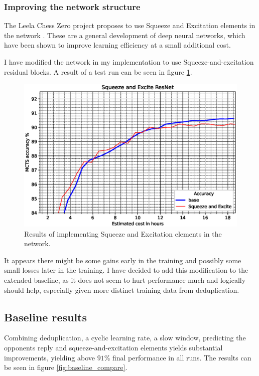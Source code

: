\documentclass[12pt,onecolumn,oneside,titlepage]{article}
\begin{document}
\subsubsection{Improving the network structure}

The Leela Chess Zero project \cite{leela0sq} proposes to use Squeeze and Excitation elements in the network \cite{hu2018squeeze}.
These are a general development of deep neural networks, which have been shown to improve learning efficiency at a small additional cost.

I have modified the network in my implementation to use Squeeze-and-excitation residual blocks. A result of a test run can be seen in figure \ref{fig:sqnet}. 

\begin{figure}[H]
\centering
\includegraphics[clip,width=\columnwidth]{sqnet}
\caption{Results of implementing Squeeze and Excitation elements in the network.}
\label{fig:sqnet}
\end{figure}

It appears there might be some gains early in the training and possibly some small losses later in the training. I have decided to add this modification to the extended baseline, as it does not seem to hurt performance much and 
logically should help, especially given more distinct training data from deduplication.

\subsection{Baseline results}

Combining deduplication, a cyclic learning rate, a slow window, predicting the opponents reply and squeeze-and-excitation elements yields substantial improvements, yielding above $91\%$ final performance in all runs. The results can be seen in figure \ref{fig:baseline_compare}.
\end{document}

